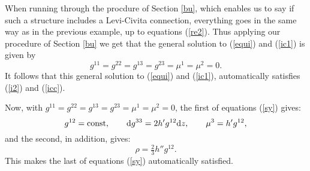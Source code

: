 \documentclass[letterpaper]{amsart}
\theoremstyle{definition}
\theoremstyle{remark}
\newcommand{\der}{{\rm d}}
\begin{document}
When running through the procdure of Section \ref{bu}, which enables
us to say if such a structure includes a Levi-Civita connection,
everything goes in the same way as in the previous example, up to
equations (\ref{re2}). Thus applying our procedure of Section \ref{bu}
we get that the general solution to (\ref{equi}) and (\ref{ic1}) is
given by
$$
g^{11}=g^{22}=g^{13}=g^{23}=\mu^1=\mu^2=0.$$
It follows that this general solution to (\ref{equi}) and (\ref{ic1}),
automatically satisfies (\ref{i2}) and (\ref{icc}). 

Now, with $g^{11}=g^{22}=g^{13}=g^{23}=\mu^1=\mu^2=0$, 
the first of equations (\ref{sy}) gives:
$$g^{12}={\rm const},\quad\quad \der g^{33}=2h' g^{12}\der z,\quad\quad
\mu^3=h' g^{12},$$
and the second, in addition, gives:
$$\rho=\tfrac23h''g^{12}.$$
This makes the last of equations (\ref{sy}) automatically satisfied. 
\end{document}

